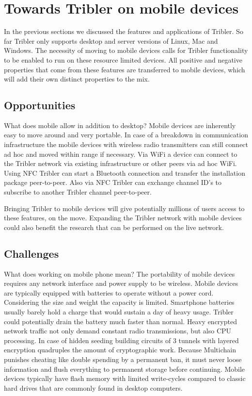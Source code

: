 \section{Towards Tribler on mobile devices}\label{ch:tribler_mobile}

In the previous sections we discussed the features and applications of Tribler.
So far Tribler only supports desktop and server versions of Linux, Mac and Windows.
The necessity of moving to mobile devices calls for Tribler functionality to be enabled to run on these resource limited devices.
All positive and negative properties that come from these features are transferred to mobile devices, which will add their own distinct properties to the mix.



\subsection{Opportunities}

What does mobile allow in addition to desktop?
Mobile devices are inherently easy to move around and very portable.
In case of a breakdown in communication infrastructure the mobile devices with wireless radio transmitters can still connect ad hoc and moved within range if necessary.
Via WiFi a device can connect to the Tribler network via existing infrastructure or other peers via ad hoc WiFi.
Using NFC Tribler can start a Bluetooth connection and transfer the installation package peer-to-peer.
Also via NFC Tribler can exchange channel ID's to subscribe to another Tribler channel peer-to-peer.

Bringing Tribler to mobile devices will give potentially millions of users access to these features, on the move.
Expanding the Tribler network with mobile devices could also benefit the research that can be performed on the live network.


\subsection{Challenges}

What does working on mobile phone mean?
The portability of mobile devices requires any network interface and power supply to be wireless.
Mobile devices are typically equipped with batteries to operate without a power cord.
Considering the size and weight the capacity is limited.
Smartphone batteries usually barely hold a charge that would sustain a day of heavy usage.
Tribler could potentially drain the battery much faster than normal.
Heavy encrypted network traffic not only demand constant radio transmissions, but also CPU processing.
In case of hidden seeding building circuits of 3 tunnels with layered encryption quadruples  the amount of cryptographic work.
Because Multichain punishes cheating like double spending by a permanent ban, it must never loose information and flush everything to permanent storage before continuing.
Mobile devices typically have flash memory with limited write-cycles compared to classic hard drives that are commonly found in desktop computers.

